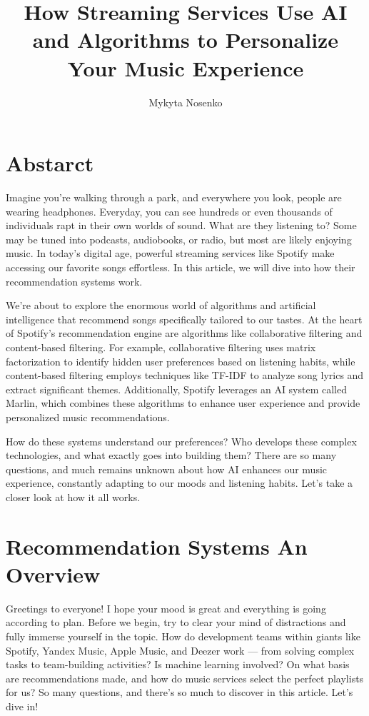 \documentclass[12pt,a4paper]{article}
\title{How Streaming Services Use AI and Algorithms to Personalize Your Music Experience}
\author{Mykyta Nosenko}
\begin{document}
\maketitle
\section*{Abstarct}

Imagine you’re walking through a park, and everywhere you look, people are wearing headphones. Everyday, you can see hundreds or even thousands of individuals rapt in their own worlds of sound. What are they listening to? Some may be tuned into podcasts, audiobooks, or radio, but most are likely enjoying music. In today’s digital age, powerful streaming services like Spotify make accessing our favorite songs effortless. In this article, we will dive into how their recommendation systems work.

We’re about to explore the enormous world of algorithms and artificial intelligence that recommend songs specifically tailored to our tastes. At the heart of Spotify’s recommendation engine are algorithms like collaborative filtering and content-based filtering. For example, collaborative filtering uses matrix factorization to identify hidden user preferences based on listening habits, while content-based filtering employs techniques like TF-IDF to analyze song lyrics and extract significant themes. Additionally, Spotify leverages an AI system called Marlin, which combines these algorithms to enhance user experience and provide personalized music recommendations\citep{href}.

How do these systems understand our preferences? Who develops these complex technologies, and what exactly goes into building them? There are so many questions, and much remains unknown about how AI enhances our music experience, constantly adapting to our moods and listening habits. Let's take a closer look at how it all works.

\newpage
\tableofcontents
\newpage

\section{Recommendation Systems An Overview}



Greetings to everyone! I hope your mood is great and everything is going according to plan. Before we begin, try to clear your mind of distractions and fully immerse yourself in the topic. How do development teams within giants like Spotify, Yandex Music, Apple Music, and Deezer work — from solving complex tasks to team-building activities? Is machine learning involved? On what basis are recommendations made, and how do music services select the perfect playlists for us? So many questions, and there's so much to discover in this article. Let's dive in!
\end{document}
